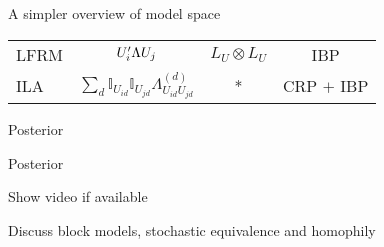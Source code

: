 \begin{frame}{A simpler overview of model space}
\begin{block}{}
\begin{tabular}{l|ccc}
    LFRM & $U_i'\Lambda U_j$ & $L_U \otimes L_U$ & IBP \\%
    ILA & $\sum_d \mathbb{I}_{U_{id}}\mathbb{I}_{U_{jd}}\Lambda^{(d)}_{U_{id}U_{jd}}$ & * & CRP $+$ IBP \\%
\end{tabular}
  \end{block}
\end{frame}

\begin{frame}{Posterior}
  \begin{block}{}
  \begin{center}
  
\end{center}
  \end{block}
\end{frame}

\begin{frame}{Posterior}
  \begin{block}{}
  Show video if available
  
  Discuss block models, stochastic equivalence and homophily
  \end{block}
\end{frame}


